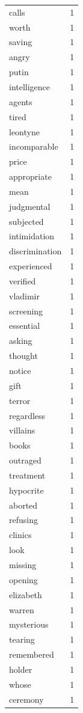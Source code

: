 \begin{tabular}{lr}
calls & 1 \\
worth & 1 \\
saving & 1 \\
angry & 1 \\
putin & 1 \\
intelligence & 1 \\
agents & 1 \\
tired & 1 \\
leontyne & 1 \\
incomparable & 1 \\
price & 1 \\
appropriate & 1 \\
mean & 1 \\
judgmental & 1 \\
subjected & 1 \\
intimidation & 1 \\
discrimination & 1 \\
experienced & 1 \\
verified & 1 \\
vladimir & 1 \\
screening & 1 \\
essential & 1 \\
asking & 1 \\
thought & 1 \\
notice & 1 \\
gift & 1 \\
terror & 1 \\
regardless & 1 \\
villains & 1 \\
books & 1 \\
outraged & 1 \\
treatment & 1 \\
hypocrite & 1 \\
aborted & 1 \\
refusing & 1 \\
clinics & 1 \\
look & 1 \\
missing & 1 \\
opening & 1 \\
elizabeth & 1 \\
warren & 1 \\
mysterious & 1 \\
tearing & 1 \\
remembered & 1 \\
holder & 1 \\
whose & 1 \\
ceremony & 1 \\

\end{tabular}
